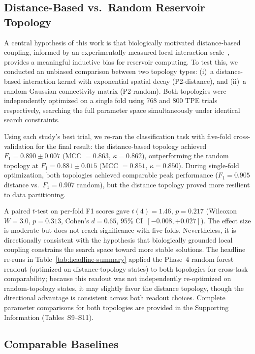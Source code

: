 \documentclass[journal=asbcd6,manuscript=article,keywords]{achemso}
\begin{document}
\subsection{Distance-Based vs.\ Random Reservoir Topology}
\label{sec:topology-comparison}

A central hypothesis of this work is that biologically motivated distance-based coupling, informed by an experimentally measured local interaction scale~\cite{Yanez2020}, provides a meaningful inductive bias for reservoir computing. 
To test this, we conducted an unbiased comparison between two topology types: (i)~a distance-based interaction kernel with exponential spatial decay (P2-distance), and (ii)~a random Gaussian connectivity matrix (P2-random). 
Both topologies were independently optimized on a single fold using 768 and 800 TPE trials respectively, searching the full parameter space simultaneously under identical search constraints.

Using each study's best trial, we re-ran the classification task with five-fold cross-validation for the final result: the distance-based topology achieved $F_1 = 0.890 \pm 0.007$ (MCC $= 0.863$, $\kappa = 0.862$), outperforming the random topology at $F_1 = 0.881 \pm 0.015$ (MCC $= 0.851$, $\kappa = 0.850$). 
During single-fold optimization, both topologies achieved comparable peak performance ($F_1 = 0.905$ distance vs.\ $F_1 = 0.907$ random), but the distance topology proved more resilient to data partitioning. 

A paired $t$-test on per-fold F1 scores gave $t(4) = 1.46$, $p = 0.217$ (Wilcoxon $W = 3.0$, $p = 0.313$, Cohen's $d = 0.65$, 95\% CI~$[-0.008, +0.027]$). The effect size is moderate but does not reach significance with five folds. 
Nevertheless, it is directionally consistent with the hypothesis that biologically grounded local coupling constrains the search space toward more stable solutions. 
The headline re-runs in Table~\ref{tab:headline-summary} applied the Phase~4 random forest readout (optimized on distance-topology states) to both topologies for cross-task comparability; because this readout was not independently re-optimized on random-topology states, it may slightly favor the distance topology, though the directional advantage is consistent across both readout choices.
Complete parameter comparisons for both topologies are provided in the Supporting Information (Tables~S9--S11).

\subsection{Comparable Baselines}\label{sec:baseline-comparisons}
\end{document}
